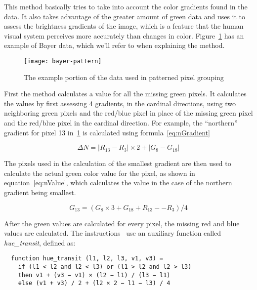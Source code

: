 This method basically tries to take into account the color gradients found in
the data. It also takes advantage of the greater amount of green data and uses
it to assess the brightness gradients of the image, which is a feature that the
human visual system perceives more accurately than changes in color.
Figure~\ref{fig:bayer-pattern} has an example of Bayer data, which we'll refer
to when explaining the method.

\begin{figure}[H]
  \centering
  \texttt{[image: bayer-pattern]}
  \caption{The example portion of the data used in patterned pixel
    grouping~\cite{chuan-kai_lin}}
\label{fig:bayer-pattern}
\end{figure}


First the method calculates a value for all the missing green pixels. It
calculates the values by first assessing 4 gradients, in the cardinal
directions, using two neighboring green pixels and the red/blue pixel in place
of the missing green pixel and the red/blue pixel in the cardinal direction.
For example, the ``northern'' gradient for pixel 13 in~\ref{fig:bayer-pattern}
is calculated using formula~\ref{eq:nGradient}

\begin{equation}
  \label{eq:nGradient}
  \Delta N = | R_{13} - R_3 | \times 2 + | G_8 - G_{18} |
\end{equation}

The pixels used in the calculation of the smallest gradient are then used to
calculate the actual green color value for the pixel, as shown in
equation~\ref{eq:nValue}, which calculates the value in the case of the
northern gradient being smallest.

\begin{equation}
  \label{eq:nValue}
  G_{13} = (G_8 \times 3 + G_{18} + R_{13} −- R_3) / 4
\end{equation}

After the green values are calculated for every pixel, the missing red and blue
values are calculated. The instructions~\cite{chuan-kai_lin} use an auxiliary
function called \textit{hue\_transit}, defined as:

\begin{verbatim}
  function hue_transit (l1, l2, l3, v1, v3) =
    if (l1 < l2 and l2 < l3) or (l1 > l2 and l2 > l3)
    then v1 + (v3 − v1) × (l2 − l1) / (l3 − l1)
    else (v1 + v3) / 2 + (l2 × 2 − l1 − l3) / 4
\end{verbatim}

